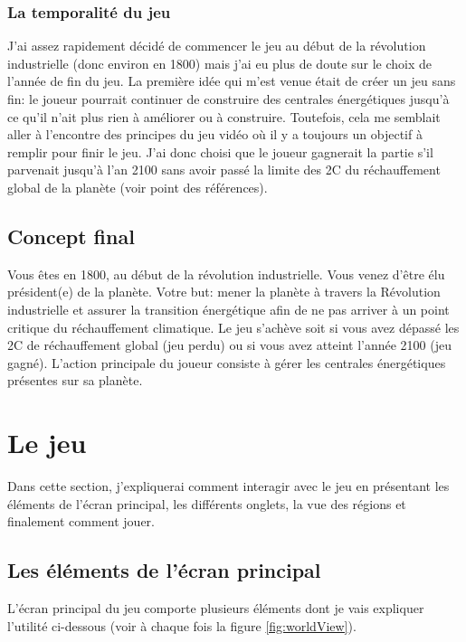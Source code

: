 \documentclass{article}
\begin{document}
        \subsubsection{La temporalité du jeu}	
        J'ai assez rapidement décidé de commencer le jeu au début de la révolution industrielle (donc environ en 1800) mais j'ai eu plus de doute sur le choix de l'année de fin du jeu. La première idée qui m'est venue était de créer un jeu sans fin: le joueur pourrait continuer de construire des centrales énergétiques jusqu'à ce qu'il n'ait plus rien à améliorer ou à construire. Toutefois, cela me semblait aller à l'encontre des principes du jeu vidéo où il y a toujours un objectif à remplir pour finir le jeu. J'ai donc choisi que le joueur gagnerait la partie s'il parvenait jusqu'à l'an 2100 sans avoir passé la limite des 2\degree C du réchauffement global de la planète (voir point \cite{objsParis2100} des références).
		
        \subsection{Concept final}
		Vous êtes en 1800, au début de la révolution industrielle. Vous venez d'être élu président(e) de la planète. Votre but: mener la planète à travers la Révolution industrielle et assurer la transition énergétique afin de ne pas arriver à un point critique du réchauffement climatique. Le jeu s'achève soit si vous avez dépassé les 2\degree C de réchauffement global (jeu perdu) ou si vous avez atteint l'année 2100 (jeu gagné).
        L'action principale du joueur consiste à gérer les centrales énergétiques présentes sur sa planète.

        \section{Le jeu}
		Dans cette section, j'expliquerai comment interagir avec le jeu en présentant les éléments de l'écran principal, les différents onglets, la vue des régions et finalement comment jouer.        
        
        \subsection{Les éléments de l'écran principal}
		L'écran principal du jeu comporte plusieurs éléments dont je vais expliquer l'utilité ci-dessous (voir à chaque fois la figure \ref{fig:worldView}).
		
\end{document}
